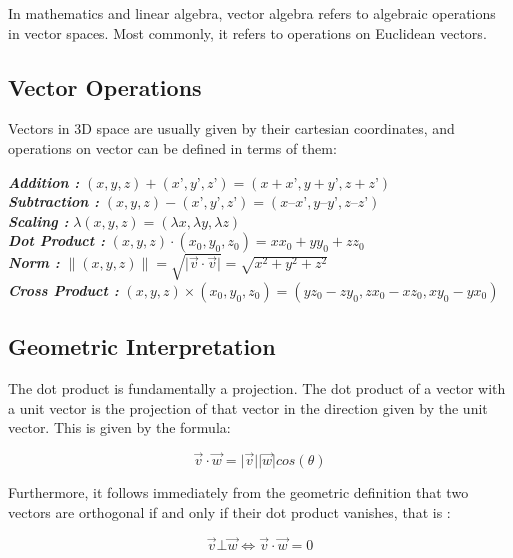\documentclass[12pt]{report}
\begin{document}
\hspace{1cm} In mathematics and linear algebra, vector algebra refers to algebraic operations in vector spaces. Most commonly, it refers to operations on Euclidean vectors.

\subsection{Vector Operations}

Vectors in 3D space are usually given by their cartesian coordinates, and operations on vector can be defined in terms of them:

\indent \textbf{\textit{Addition : }} $ (x, y, z) + (x’ , y’ ,z’) = (x + x’, y + y’, z + z’) $  \\
\indent \textbf{\textit{Subtraction : }} $(x, y, z) − (x’ , y’ ,z’) = (x – x’ ,y – y’, z – z’)$ \\
\indent \textbf{\textit{Scaling : }} $ \lambda (x, y, z) = (\lambda x, \lambda y, \lambda z)  $ \\
\indent \textbf{\textit{Dot Product : }}$ (x, y, z) \cdot (x_{0} , y_{0} ,z_{0} ) = x x_{0} + y y_{0} + z z_{0} $ \\
\indent \textbf{\textit{Norm : }} $ \| ( x , y , z ) \| = \sqrt{\vert \overrightarrow{v} \cdot \overrightarrow{v} \vert } = \sqrt{x^2 + y^2 + z^2} $ \\
\indent \textbf{\textit{Cross Product : }} $ (x, y, z ) \times (x_{0} , y_{0} ,z_{0} ) = (yz_{0} − zy_{0} ,zx_{0} − xz_{0} , xy_{0} − yx_{0} ) $ \\

\subsection{Geometric Interpretation}

The dot product is fundamentally a projection. The dot product of a vector with a unit vector is the projection of that vector in the direction given by the unit vector. This is given by the formula:

\[ \overrightarrow{v} \cdot \overrightarrow{w} = \vert \overrightarrow{v} \vert \vert \overrightarrow{w} \vert  cos (\theta) \]


Furthermore, it follows immediately from the geometric definition that two vectors are orthogonal if and only if their dot product vanishes, that is : 

\[ \overrightarrow{v} \bot \overrightarrow{w} \Leftrightarrow \overrightarrow{v} \cdot \overrightarrow{w} = 0 \]
\end{document}
